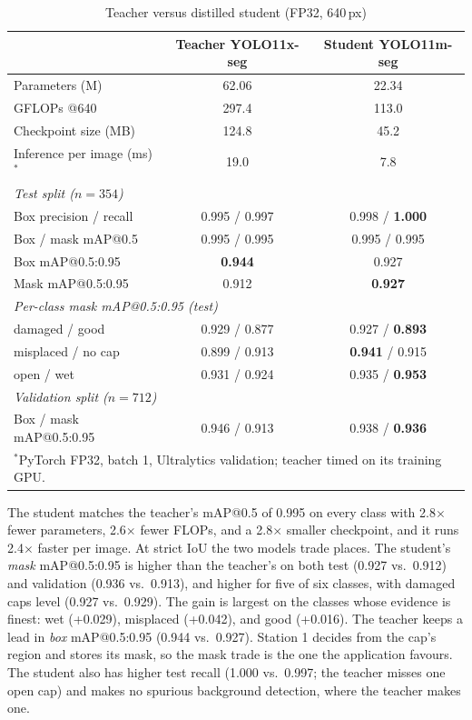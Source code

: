 \begin{table}[htbp]
\centering
\caption{Teacher versus distilled student (FP32, 640\,px)}
\label{tab:kd}
\begin{tabular}{|l|c|c|}
\hline
 & \textbf{Teacher YOLO11x-seg} & \textbf{Student YOLO11m-seg} \\ \hline
Parameters (M) & 62.06 & 22.34 \\ \hline
GFLOPs @640 & 297.4 & 113.0 \\ \hline
Checkpoint size (MB) & 124.8 & 45.2 \\ \hline
Inference per image (ms)$^{*}$ & 19.0 & 7.8 \\ \hline
\multicolumn{3}{|l|}{\textit{Test split ($n=354$)}} \\ \hline
Box precision / recall & 0.995 / 0.997 & 0.998 / \textbf{1.000} \\ \hline
Box / mask mAP@0.5 & 0.995 / 0.995 & 0.995 / 0.995 \\ \hline
Box mAP@0.5:0.95 & \textbf{0.944} & 0.927 \\ \hline
Mask mAP@0.5:0.95 & 0.912 & \textbf{0.927} \\ \hline
\multicolumn{3}{|l|}{\textit{Per-class mask mAP@0.5:0.95 (test)}} \\ \hline
damaged / good & 0.929 / 0.877 & 0.927 / \textbf{0.893} \\ \hline
misplaced / no cap & 0.899 / 0.913 & \textbf{0.941} / 0.915 \\ \hline
open / wet & 0.931 / 0.924 & 0.935 / \textbf{0.953} \\ \hline
\multicolumn{3}{|l|}{\textit{Validation split ($n=712$)}} \\ \hline
Box / mask mAP@0.5:0.95 & 0.946 / 0.913 & 0.938 / \textbf{0.936} \\ \hline
\multicolumn{3}{l}{\small $^{*}$PyTorch FP32, batch 1, Ultralytics validation; teacher timed on its training GPU.}
\end{tabular}
\end{table}

The student matches the teacher's mAP@0.5 of 0.995 on every class with 2.8$\times$ fewer parameters, 2.6$\times$ fewer FLOPs, and a 2.8$\times$ smaller checkpoint, and it runs 2.4$\times$ faster per image. At strict IoU the two models trade places. The student's \emph{mask} mAP@0.5:0.95 is higher than the teacher's on both test (0.927 vs.\ 0.912) and validation (0.936 vs.\ 0.913), and higher for five of six classes, with damaged caps level (0.927 vs.\ 0.929). The gain is largest on the classes whose evidence is finest: wet (+0.029), misplaced (+0.042), and good (+0.016). The teacher keeps a lead in \emph{box} mAP@0.5:0.95 (0.944 vs.\ 0.927). Station 1 decides from the cap's region and stores its mask, so the mask trade is the one the application favours. The student also has higher test recall (1.000 vs.\ 0.997; the teacher misses one open cap) and makes no spurious background detection, where the teacher makes one.

